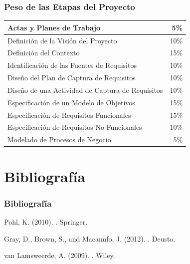 \documentclass[a4paper,slidestop,xcolor=pst,dvips,blue]{beamer}
\begin{document}
\begin{frame}[c]
	\frametitle{Peso de las Etapas del Proyecto}
    \begin{center}
	\begin{tabular}{||l|r||}
    \hline \hline
    Actas y Planes de Trabajo        & 5\% \\ \hline
    Definición de la Visión del Proyecto        & 10\% \\ \hline
    Definición del Contexto                           & 15\% \\ \hline
    Identificación de las Fuentes de Requisitos & 10\% \\ \hline
    Diseño del Plan de Captura de Requisitos    & 10\% \\ \hline \hline
    Diseño de una Actividad de Captura de Requisitos & 10\% \\ \hline
    Especificación de un Modelo de Objetivos    & 15\% \\ \hline
    Especificación de Requisitos Funcionales    & 15\% \\ \hline
    Especificación de Requisitos No Funcionales & 10\% \\ \hline \hline
    Modelado de Procesos de Negocio             &  5\% \\ \hline \hline
	\end{tabular}
\end{center}
\end{frame}

\section{Bibliografía}

\begin{frame}[c]
	\frametitle{Bibliografía}
\begin{thebibliography}{}

Pohl, K. (2010).
.
\newblock Springer.

Gray, D., Brown, S., and Macanufo, J. (2012).
.
\newblock Deusto.

van Lamsweerde, A. (2009).
.
\newblock Wiley.

\end{thebibliography}
\end{frame}
\end{document}
